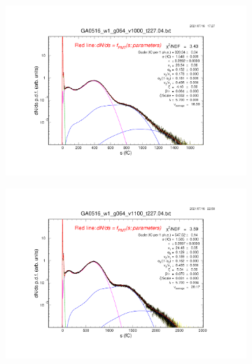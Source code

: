 \begin{figure}[b]
	\centering
	\begin{subfigure}[c]{0.42\linewidth}
		\centering
		\includegraphics[width=\linewidth, trim={6cm 6cm 75mm 85mm},clip]{figures/GA0516_w1_g064_v1000_6mm_log.04.png}
		\vspace{0mm}
	\end{subfigure}%
	\begin{subfigure}[c]{0.42\linewidth}
		\centering
		\includegraphics[width=\linewidth, trim={75mm 6cm 6cm 85mm},clip]{figures/GA0516_w1_g064_v1100_6mm_log.04.png}
		\vspace{0mm}
	\end{subfigure}%
	\vspace{0mm}
	\begin{subfigure}[c]{0.42\linewidth}

\end{subfigure}
\end{figure}
